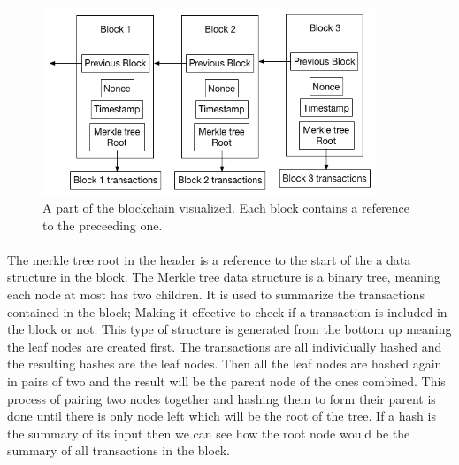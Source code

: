\documentclass[informationsecurity]{gucmasterproject}
\begin{document}
\begin{figure}[h]
    \centering
    \includegraphics[width=10cm]{figs/blockchain.png}
    \caption{A part of the blockchain visualized. Each block contains a reference to the preceeding one.}
    \label{fig:blockchain}
\end{figure}


\paragraph{}
The merkle tree root in the header is a reference to the start of the a data structure in the block. The Merkle tree data structure is a binary tree, meaning each node at most has two children. It is used to summarize the transactions contained in the block; Making it effective to check if a transaction is included in the block or not. This type of structure is generated from the bottom up meaning the leaf nodes are created first. The transactions are all individually hashed and the resulting hashes are the leaf nodes. Then all the leaf nodes are hashed again in pairs of two and the result will be the parent node of the ones combined. This process of pairing two nodes together and hashing them to form their parent is done until there is only node left which will be the root of the tree. If a hash is the summary of its input then we can see how the root node would be the summary of all transactions in the block.
\end{document}
